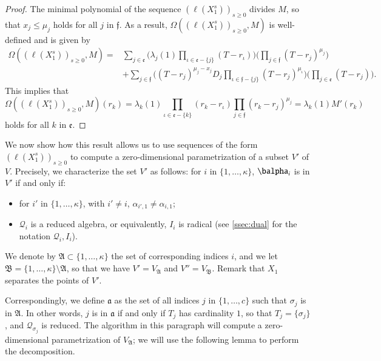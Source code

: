 \documentclass[final,1p,times,authoryear]{elsarticle}
\newcommand{\residueI}{\mathscr{Q}}
\def\dg{\kappa}
\begin{document}
\begin{proof}

  The minimal polynomial of the sequence $(\ell(X_1^s))_{s \ge
  0}$ divides $M$, so that $x_j \le \mu_j$ holds for all $j$
  in $\mathfrak{f}$.  As a result,
  $\Omega((\ell(X_1^s))_{s\ge0},M)$ is well-defined and is given by
  \begin{align*}
    \Omega((\ell(X_1^s))_{s\ge0},M)=&
    \sum_{j \in \mathfrak{e}}
    \Big(
    \lambda_j(1) \prod_{\iota \in \mathfrak{e}-\{j\}}(T-r_\iota)\Big)
    \Big(\prod_{j \in \mathfrak{f}}(T-r_j)^{\mu_j} \Big)\\
                                    &+
                                    \sum_{j\in \mathfrak{f}}
                                    \Big(  (T-r_j)^{\mu_j-x_j} D_j
                                    \prod_{\iota \in \mathfrak{f}-\{j\}}(T-r_j)^{\mu_\iota}\Big)
                                    \Big(\prod_{j\in \mathfrak{e}} (T-r_j) \Big).
  \end{align*}
  This implies that $$\Omega((\ell(X_1^s))_{s\ge0},M)(r_k) =\lambda_k(1) 
  \prod_{\iota \in \mathfrak{e}-\{k\}}(r_k-r_\iota)
  \prod_{j \in \mathfrak{f}}(r_k-r_j)^{\mu_j} = \lambda_k(1) M'(r_k)$$ 
  holds for all $k$ in $\mathfrak{e}$.
\end{proof}

We now show how this result allows us to use sequences of the form
$(\ell(X_1^s))_{s \ge 0}$ to compute a zero-dimensional
parametrization of a subset $V'$ of $V$. Precisely, we characterize
the set $V'$ as follows: for $i$ in $\{1,\dots,\dg\}$, $\balpha_i$ is
in $V'$ if and only if:
\begin{itemize}
  \item for $i'$ in $\{1,\dots,\dg\}$, with $i'\ne i$, $\alpha_{i',1} \ne
    \alpha_{i,1}$;
  \item $\residueI_i$ is a reduced algebra, or equivalently, $I_i$ is radical (see \cref{ssec:dual} 
    for the notation $\residueI_i,I_i$).
\end{itemize}
We denote by $\mathfrak{A}\subset \{1,\dots,\dg\}$ the set of
corresponding indices $i$, and we let
$\mathfrak{B}=\{1,\dots,\dg\}\setminus\mathfrak{A}$, so that we have
$V'=V_{\mathfrak{A}}$ and $V''=V_{\mathfrak{B}}$.  Remark that $X_1$
separates the points of $V'$.

Correspondingly, we define $\mathfrak{a}$ as the set of all indices
$j$ in $\{1,\dots,c\}$ such that $\sigma_j$ is in $\mathfrak{A}$. In
other words, $j$ is in $\mathfrak{a}$ if and only if $T_j$ has
cardinality $1$, so that $T_j=\{\sigma_j\}$, and
$\residueI_{\sigma_j}$ is reduced.  The algorithm in this paragraph
will compute a zero-dimensional parametrization of $V_{\mathfrak{A}}$;
we will use the following lemma to perform the decomposition.
\end{document}
